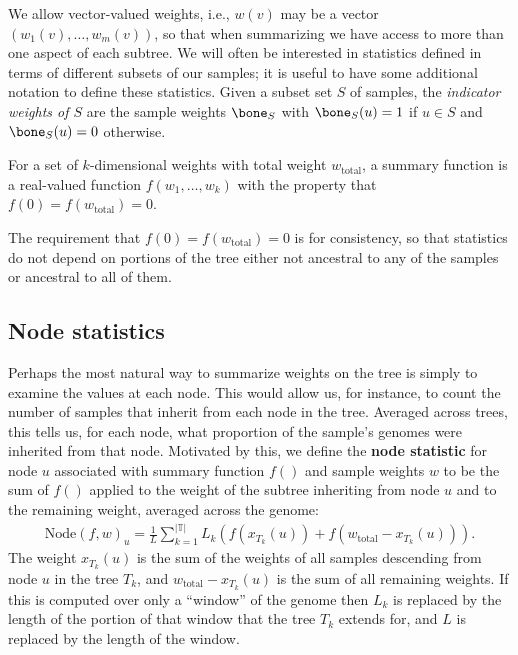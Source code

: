\documentclass{article}
\newcommand{\node}{\mbox{Node}} %
\newcommand{\treeseq}{\mathbb{T}} %
\newcommand{\iw}{w} %
\newcommand{\tiw}{w_\text{total}} %
\newcommand{\nw}{x} %
\begin{document}
We allow vector-valued weights,
i.e., $\iw(v)$ may be a vector $(\iw_1(v), \ldots, \iw_m(v))$,
so that when summarizing we have access to more than one aspect of each subtree.
We will often be interested in statistics defined in terms of different subsets of our samples;
it is useful to have some additional notation to define these statistics.
Given a subset set $S$ of samples,
the \emph{indicator weights of $S$} are the sample weights $\bone_S$ with
$\bone_S(u) = 1$ if $u \in S$ and $\bone_S(u) = 0$ otherwise.

\begin{definition}
    For a set of $k$-dimensional weights with total weight $\tiw$,
    a summary function is a real-valued function $f(w_1, \ldots, w_k)$
    with the property that $f(0) = f(\tiw) = 0$.
\end{definition}

The requirement that $f(0) = f(\tiw) = 0$ is for consistency,
so that statistics do not depend on portions of the tree either not ancestral to any of the samples
or ancestral to all of them.



\subsection*{Node statistics}

Perhaps the most natural way to summarize weights on the tree
is simply to examine the values at each node.
This would allow us, for instance, to
count the number of samples that inherit from each node in the tree.
Averaged across trees,
this tells us, for each node, what proportion of the sample's genomes were inherited from that node.
Motivated by this, we define the
\textbf{node statistic} for node $u$
associated with summary function $f()$ and sample weights $\iw$
to be the sum of $f()$ applied to the weight of the subtree inheriting from node $u$
and to the remaining weight,
averaged across the genome:
\begin{align}
    \node(f, \iw)_u
    =
    \frac{1}{L} \sum_{k=1}^{|\treeseq|} L_k \left( f(\nw_{T_k}(u)) + f(\tiw - \nw_{T_k}(u)) \right).
\end{align}
The weight $\nw_{T_k}(u)$ is the sum of the weights of all samples descending from node $u$
in the tree $T_k$,
and $\tiw - \nw_{T_k}(u)$ is the sum of all remaining weights.
If this is computed over only a ``window'' of the genome
then $L_k$ is replaced by the length of the portion of that window that the tree $T_k$ extends for,
and $L$ is replaced by the length of the window.
\end{document}
